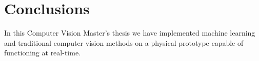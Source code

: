 
\section{Conclusions}

In this Computer Vision Master's thesis we have implemented machine learning and traditional computer vision methods on a physical prototype capable of functioning at real-time. 
